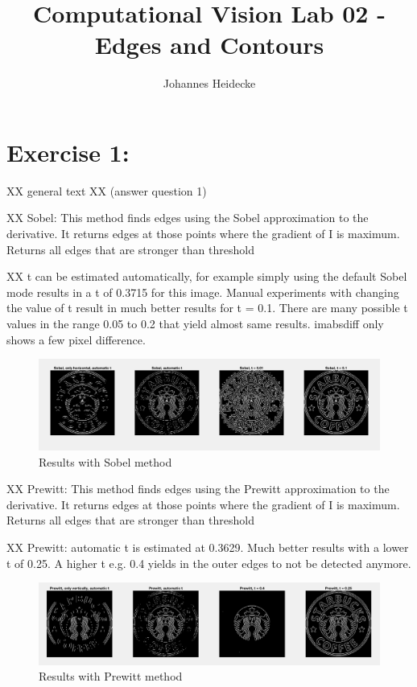 \documentclass[11pt]{article}
\title{Computational Vision Lab 02 - Edges and Contours}
\author{Johannes Heidecke}
\begin{document}
\maketitle


\section*{Exercise 1:}


XX general text XX (answer question 1)

XX Sobel: This method finds edges using the Sobel approximation to the derivative. It returns edges at those points where the gradient of I is maximum. Returns all edges that are stronger than threshold

XX t can be estimated automatically, for example simply using the default Sobel mode results in a t of 0.3715 for this image. Manual experiments with changing the value of t result in much better results for t = 0.1. There are many possible t values in the range 0.05 to 0.2 that yield almost same results. imabsdiff only shows a few pixel difference.

\begin{figure}[!hbt]
  \includegraphics[width=\textwidth]{im1}
  \caption{Results with Sobel method}
  \label{fig:im1}
\end{figure}

XX Prewitt: This method finds edges using the Prewitt approximation to the derivative. It returns edges at those points where the gradient of I is maximum. Returns all edges that are stronger than threshold

XX Prewitt: automatic t is estimated at 0.3629. Much better results with a lower t of 0.25. A higher t e.g. 0.4 yields in the outer edges to not be detected anymore.

\begin{figure}[!hbt]
  \includegraphics[width=\textwidth]{im2}
  \caption{Results with Prewitt method}
  \label{fig:im2}
\end{figure}
\end{document}
